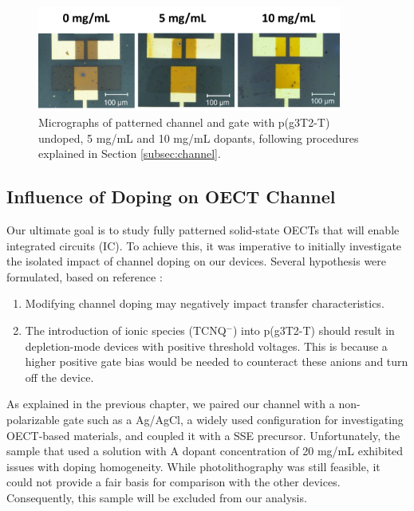 \begin{figure}[ht]
  \centering
  \includegraphics[width=10cm]{Images/pdf/BigGateDevices.pdf}
  \caption[Micrographs of a patterned channel and gate p(g3T2-T) at different doping levels]{Micrographs of patterned channel and gate with p(g3T2-T) undoped, 5 mg/mL and 10 mg/mL dopants, following procedures explained in Section \ref{subsec:channel}.}
  \label{fig:channel}
\end{figure}


\subsection{Influence of Doping on OECT Channel}
Our ultimate goal is to study fully patterned solid-state OECTs that will enable integrated circuits (IC). To achieve this, it was imperative to initially investigate the isolated impact of channel doping on our devices. Several hypothesis were formulated, based on reference \cite{tanTuningOrganicElectrochemical2022}:

\begin{enumerate}
\item Modifying channel doping may negatively impact transfer characteristics.
\item The introduction of ionic species (TCNQ$^{-}$) into p(g3T2-T) should result in depletion-mode devices with positive threshold voltages. This is because a higher positive gate bias would be needed to counteract these anions and turn off the device.
\end{enumerate}

As explained in the previous chapter, we paired our channel with a non-polarizable gate such as a Ag/AgCl, a widely used configuration for investigating OECT-based materials, and coupled it with a SSE precursor. Unfortunately, the sample that used a solution with A dopant concentration of 20 mg/mL exhibited issues with doping homogeneity. While photolithography was still feasible, it could not provide a fair basis for comparison with the other devices. Consequently, this sample will be excluded from our analysis.

